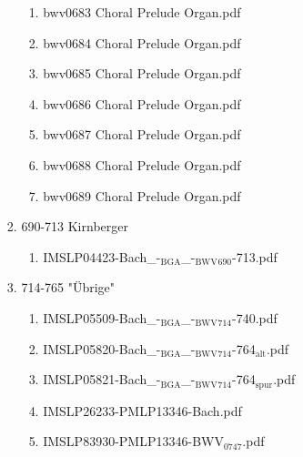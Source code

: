 \documentclass[11pt]{article}
\begin{document}
\begin{enumerate}
\begin{enumerate}
\begin{enumerate}
\begin{enumerate}
\item bwv0683   Choral Prelude Organ.pdf
\label{sec-1-1-1-1-44-6-4-1-15-15}

\item bwv0684   Choral Prelude Organ.pdf
\label{sec-1-1-1-1-44-6-4-1-15-16}

\item bwv0685   Choral Prelude Organ.pdf
\label{sec-1-1-1-1-44-6-4-1-15-17}

\item bwv0686   Choral Prelude Organ.pdf
\label{sec-1-1-1-1-44-6-4-1-15-18}

\item bwv0687   Choral Prelude Organ.pdf
\label{sec-1-1-1-1-44-6-4-1-15-19}

\item bwv0688   Choral Prelude Organ.pdf
\label{sec-1-1-1-1-44-6-4-1-15-20}

\item bwv0689   Choral Prelude Organ.pdf
\label{sec-1-1-1-1-44-6-4-1-15-21}
\end{enumerate}

\item 690-713 Kirnberger
\label{sec-1-1-1-1-44-6-4-1-16}
\begin{enumerate}
\item IMSLP04423-Bach\_-$_{\text{BGA}}$\_-$_{\text{BWV}}$$_{\text{690}}$-713.pdf
\label{sec-1-1-1-1-44-6-4-1-16-1}
\end{enumerate}

\item 714-765 "Übrige"
\label{sec-1-1-1-1-44-6-4-1-17}
\begin{enumerate}
\item IMSLP05509-Bach\_-$_{\text{BGA}}$\_-$_{\text{BWV}}$$_{\text{714}}$-740.pdf
\label{sec-1-1-1-1-44-6-4-1-17-1}

\item IMSLP05820-Bach\_-$_{\text{BGA}}$\_-$_{\text{BWV}}$$_{\text{714}}$-764$_{\text{alt}}$.pdf
\label{sec-1-1-1-1-44-6-4-1-17-2}

\item IMSLP05821-Bach\_-$_{\text{BGA}}$\_-$_{\text{BWV}}$$_{\text{714}}$-764$_{\text{spur}}$.pdf
\label{sec-1-1-1-1-44-6-4-1-17-3}

\item IMSLP26233-PMLP13346-Bach.pdf
\label{sec-1-1-1-1-44-6-4-1-17-4}

\item IMSLP83930-PMLP13346-BWV$_{\text{0747}}$.pdf
\label{sec-1-1-1-1-44-6-4-1-17-5}


\end{enumerate}
\end{enumerate}
\end{enumerate}
\end{enumerate}
\end{document}
